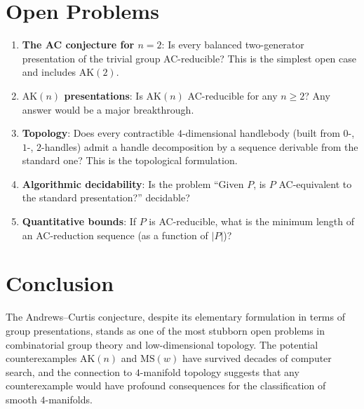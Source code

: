 \documentclass[12pt,a4paper]{amsart}
\theoremstyle{definition}
\theoremstyle{remark}
\begin{document}
\section{Open Problems}

\begin{enumerate}[label=(\arabic*)]
  \item \textbf{The AC conjecture for $n=2$}: Is every balanced two-generator presentation
        of the trivial group AC-reducible? This is the simplest open case and includes $\mathrm{AK}(2)$.

  \item \textbf{$\mathrm{AK}(n)$ presentations}: Is $\mathrm{AK}(n)$ AC-reducible for
        any $n \geq 2$? Any answer would be a major breakthrough.

  \item \textbf{Topology}: Does every contractible $4$-dimensional handlebody (built
        from $0$-, $1$-, $2$-handles) admit a handle decomposition by a sequence
        derivable from the standard one? This is the topological formulation.

  \item \textbf{Algorithmic decidability}: Is the problem ``Given $P$, is $P$
        AC-equivalent to the standard presentation?'' decidable?

  \item \textbf{Quantitative bounds}: If $P$ is AC-reducible, what is the minimum
        length of an AC-reduction sequence (as a function of $|P|$)?
\end{enumerate}

\section{Conclusion}

The Andrews--Curtis conjecture, despite its elementary formulation in terms of
group presentations, stands as one of the most stubborn open problems in
combinatorial group theory and low-dimensional topology. The potential counterexamples
$\mathrm{AK}(n)$ and $\mathrm{MS}(w)$ have survived decades of computer search,
and the connection to $4$-manifold topology suggests that any counterexample
would have profound consequences for the classification of smooth $4$-manifolds.
\end{document}

